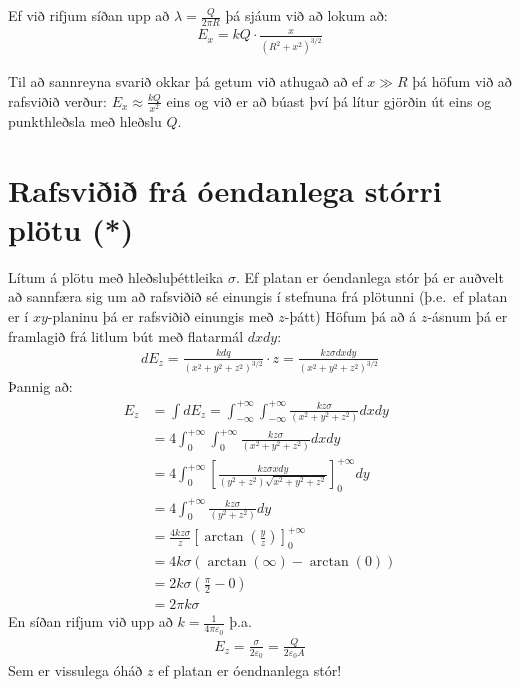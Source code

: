 Ef við rifjum síðan upp að $\lambda = \frac{Q}{2\pi R}$ þá sjáum við að lokum að:
\begin{align*}
    E_x = kQ \cdot \frac{x}{(R^2 + x^2)^{3/2}}
\end{align*}

Til að sannreyna svarið okkar þá getum við athugað að ef $x \gg R$ þá höfum við að rafsviðið verður: $E_x \approx \frac{kQ}{x^2}$ eins og við er að búast því þá lítur gjörðin út eins og punkthleðsla með hleðslu $Q$.
  

\section{Rafsviðið frá óendanlega stórri plötu (*)}
Lítum á plötu með hleðsluþéttleika $\sigma$. Ef platan er óendanlega stór þá er auðvelt að sannfæra sig um að rafsviðið sé einungis í stefnuna frá plötunni (þ.e.~ef platan er í $xy$-planinu þá er rafsviðið einungis með $z$-þátt) Höfum þá að á $z$-ásnum þá er framlagið frá litlum bút með flatarmál $dxdy$:
\begin{align*}
    dE_z = \frac{kdq}{(x^2+y^2 + z^2)^{3/2}}\cdot z = \frac{kz\sigma dx dy}{(x^2+y^2+z^2)^{3/2}}
\end{align*}
Þannig að:
\begin{align*}
    E_z &= \int dE_z = \int_{-\infty}^{+\infty} \int_{-\infty}^{+\infty} \frac{kz\sigma}{(x^2+y^2+z^2)}dxdy \\ &= 4\int_{0}^{+\infty} \int_{0}^{+\infty} \frac{kz\sigma}{(x^2+y^2+z^2)}dxdy \\
    &= 4 \int_{0}^{+\infty} \left[ \frac{kz\sigma x dy}{(y^2+z^2)\sqrt{x^2+y^2+z^2}} \right]_{0}^{+\infty} dy \\
    &= 4 \int_{0}^{+\infty} \frac{kz\sigma}{(y^2+z^2)}dy \\
    &= \frac{4kz\sigma}{z} \left[ \arctan(\frac{y}{z}) \right]_{0}^{+\infty} \\
    &= 4k\sigma \left( \arctan(\infty) - \arctan(0) \right) \\
    &= 2k\sigma \left( \frac{\pi}{2} - 0 \right) \\
    &= 2\pi k \sigma
\end{align*}
En síðan rifjum við upp að $k = \frac{1}{4\pi \varepsilon_0}$ þ.a.~
\begin{align*}
    E_z = \frac{\sigma}{2\varepsilon_0} = \frac{Q}{2\varepsilon_0 A}
\end{align*}
Sem er vissulega óháð $z$ ef platan er óendnanlega stór!

\newpage

